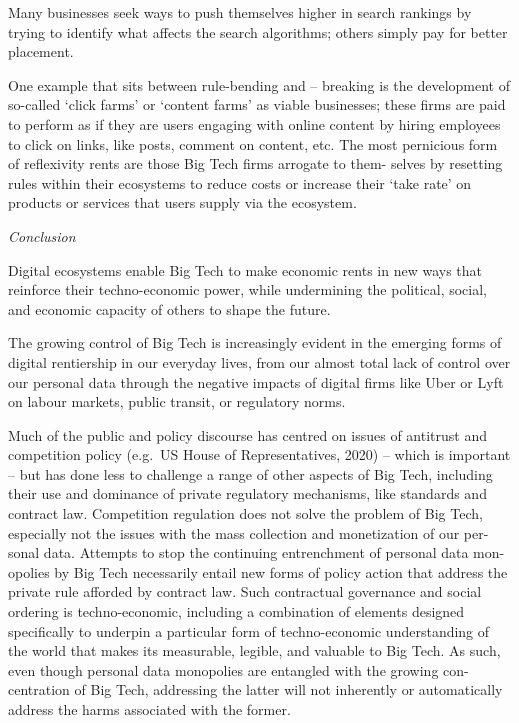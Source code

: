 \documentclass[
]{book}
\begin{document}
Many businesses seek ways to push themselves higher in search rankings by
trying to identify what affects the search algorithms; others simply pay for better
placement.

One example that sits between rule-bending and -- breaking is the
development of so-called `click farms' or `content farms' as viable businesses;
these firms are paid to perform as if they are users engaging with online content
by hiring employees to click on links, like posts, comment on content, etc. The
most pernicious form of reflexivity rents are those Big Tech firms arrogate to them-
selves by resetting rules within their ecosystems to reduce costs or increase their
`take rate' on products or services that users supply via the ecosystem.

\emph{Conclusion}

Digital ecosystems enable Big Tech to make economic rents in
new ways that reinforce their techno-economic power, while undermining the
political, social, and economic capacity of others to shape the future.

The growing control of Big Tech is increasingly evident in the emerging
forms of digital rentiership in our everyday lives, from our almost total lack of
control over our personal data through the negative impacts of digital firms like
Uber or Lyft on labour markets, public transit, or regulatory norms.

Much of the public and policy discourse has centred on issues of antitrust and
competition policy (e.g.~US House of Representatives, 2020) -- which is important
-- but has done less to challenge a range of other aspects of Big Tech, including
their use and dominance of private regulatory mechanisms, like standards and
contract law. Competition regulation does not solve the problem of Big Tech,
especially not the issues with the mass collection and monetization of our per-
sonal data. Attempts to stop the continuing entrenchment of personal data mon-
opolies by Big Tech necessarily entail new forms of policy action that address the
private rule afforded by contract law. Such contractual governance and social
ordering is techno-economic, including a combination of elements designed
specifically to underpin a particular form of techno-economic understanding
of the world that makes its measurable, legible, and valuable to Big Tech. As
such, even though personal data monopolies are entangled with the growing con-
centration of Big Tech, addressing the latter will not inherently or automatically
address the harms associated with the former.
\end{document}
